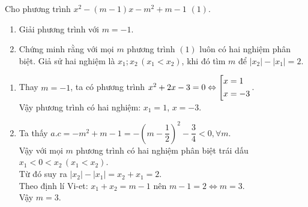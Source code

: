 \begin{ex}%
    Cho phương trình $x^2-(m-1)x-m^2+m-1$ $(1)$.
    \begin{enumerate}
        \item Giải phương trình với $m=-1$.
        \item Chứng minh rằng với mọi $m$ phương trình $(1)$ luôn có hai nghiệm phân biệt. Giả sử hai nghiệm là $x_1; x_2\, (x_1<x_2)$, khi đó tìm $m$ để $|x_2|-|x_1|=2$.
    \end{enumerate}
\loigiai
    {
    \begin{enumerate}
        \item Thay $m=-1$, ta có phương trình $x^2+2x-3=0\Leftrightarrow \left[\begin{aligned}x&=1\\ x&=-3\end{aligned}\right.$.\\
        Vậy phương trình có hai nghiệm: $x_1=1$, $x=-3$.
        \item Ta thấy $a.c=-m^2+m-1=-\left(m-\dfrac{1}{2}\right)^2-\dfrac{3}{4}<0, \forall m$. \\
        Vậy với mọi $m$ phương trình có hai nghiệm phân biệt trái dấu $x_1<0<x_2\, (x_1<x_2)$. \\
        Từ đó suy ra $|x_2|-|x_1|=x_2+x_1=2$. \\
        Theo định lí Vi-et: $x_1+x_2=m-1$ nên $m-1=2\Leftrightarrow m=3$.\\
        Vậy $m=3$.
    \end{enumerate}
    }
\end{ex}

